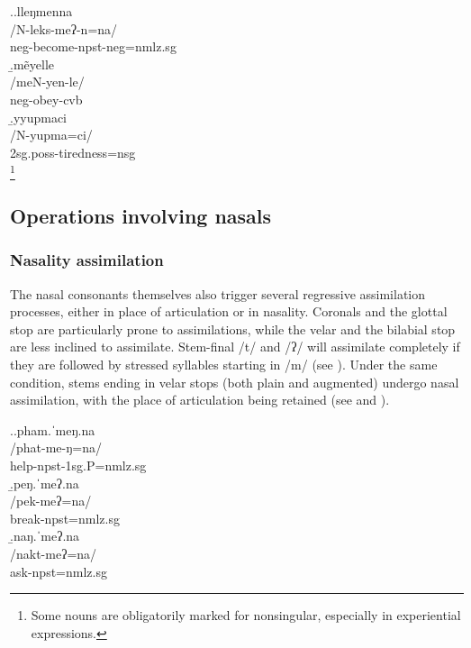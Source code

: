 \ex.\a.\glll lleŋmenna\\
		/N-leks-meʔ-n=na/\\
		{\sc neg-}become{\sc [3sg]-npst-neg=nmlz.sg}\\
		\b.\glll mẽyelle\\
		/meN-yen-le/\\
		{\sc neg-}obey{\sc -cvb}\\
		\b.\glll yyupmaci\\
		/N-yupma=ci/\\
		{\sc 2sg.poss-}tiredness{\sc =nsg}\\
		\footnote{Some nouns are obligatorily marked for nonsingular, especially in experiential expressions.}


\subsection{Operations involving nasals}\label{nas-strat}			

\subsubsection{Nasality  assimilation}
		
The nasal consonants themselves also trigger several regressive assimilation processes, either in place of articulation or in nasality. Coronals and the glottal stop are particularly prone to assimilations, while the velar and the bilabial stop are less inclined to assimilate. Stem-final /t/ and /ʔ/ will assimilate completely if they are followed by stressed syllables starting in /m/ (see \Next[a]). Under the same condition, stems ending in velar stops (both plain and augmented) undergo nasal assimilation,  with the place of articulation being retained (see \Next[b] and \Next[c]).

\ex.\a.\glll pham.ˈmeŋ.na\\
/phat-me-ŋ=na/\\
help{\sc [3sg.A]-npst-1sg.P=nmlz.sg}\\
\b.\glll  peŋ.ˈmeʔ.na\\
/pek-meʔ=na/\\
break{\sc [3sg]-npst=nmlz.sg}\\
\b.\glll  naŋ.ˈmeʔ.na\\
/nakt-meʔ=na/\\
ask{\sc [3sg]-npst=nmlz.sg}\\

